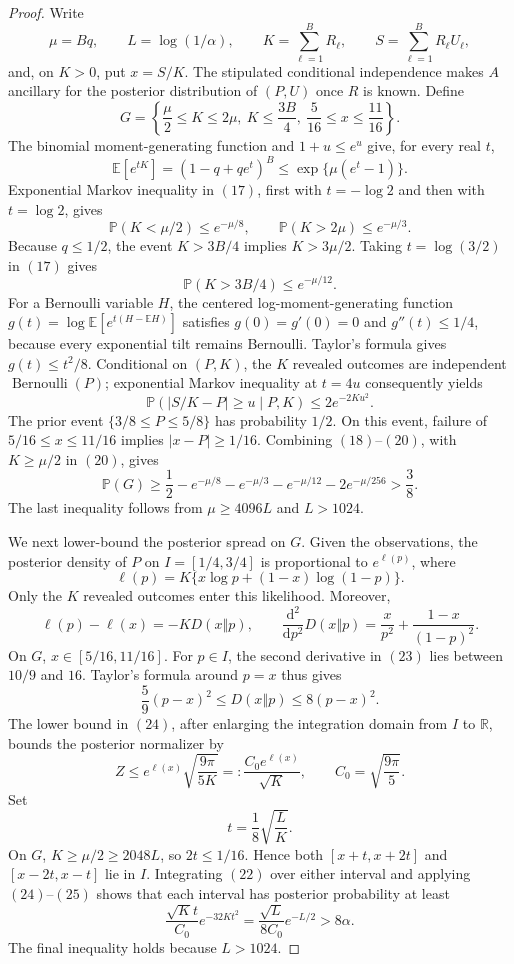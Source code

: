 \documentclass{article}
\begin{document}
\begin{proof}
Write
\[
\mu=Bq,\qquad L=\log(1/\alpha),\qquad K=\sum_{\ell=1}^B R_\ell,\qquad S=\sum_{\ell=1}^B R_\ell U_\ell,
\]
and, on \(K>0\), put \(x=S/K\). The stipulated conditional independence makes \(A\) ancillary for the posterior distribution of \((P,U)\) once \(R\) is known. Define
\[
G=\left\{\frac\mu2\le K\le2\mu,\ K\le\frac{3B}{4},\ \frac5{16}\le x\le\frac{11}{16}\right\}.
\tag{16}
\]
The binomial moment-generating function and \(1+u\le e^u\) give, for every real \(t\),
\[
\mathbb E[e^{tK}]=(1-q+qe^t)^B\le\exp\{\mu(e^t-1)\}.
\tag{17}
\]
Exponential Markov inequality in \((17)\), first with \(t=-\log2\) and then with \(t=\log2\), gives
\[
\mathbb P(K<\mu/2)\le e^{-\mu/8},
\qquad
\mathbb P(K>2\mu)\le e^{-\mu/3}.
\tag{18}
\]
Because \(q\le1/2\), the event \(K>3B/4\) implies \(K>3\mu/2\). Taking \(t=\log(3/2)\) in \((17)\) gives
\[
\mathbb P(K>3B/4)\le e^{-\mu/12}.
\tag{19}
\]
For a Bernoulli variable \(H\), the centered log-moment-generating function \(g(t)=\log\mathbb E[e^{t(H-\mathbb EH)}]\) satisfies \(g(0)=g'(0)=0\) and \(g''(t)\le1/4\), because every exponential tilt remains Bernoulli. Taylor's formula gives \(g(t)\le t^2/8\). Conditional on \((P,K)\), the \(K\) revealed outcomes are independent \(\operatorname{Bernoulli}(P)\); exponential Markov inequality at \(t=4u\) consequently yields
\[
\mathbb P(|S/K-P|\ge u\mid P,K)\le2e^{-2Ku^2}.
\tag{20}
\]
The prior event \(\{3/8\le P\le5/8\}\) has probability \(1/2\). On this event, failure of \(5/16\le x\le11/16\) implies \(|x-P|\ge1/16\). Combining \((18)\)--\((20)\), with \(K\ge\mu/2\) in \((20)\), gives
\[
\mathbb P(G)
\ge\frac12-e^{-\mu/8}-e^{-\mu/3}-e^{-\mu/12}-2e^{-\mu/256}
>\frac38.
\tag{21}
\]
The last inequality follows from \(\mu\ge4096L\) and \(L>1024\).

We next lower-bound the posterior spread on \(G\). Given the observations, the posterior density of \(P\) on \(I=[1/4,3/4]\) is proportional to \(e^{\ell(p)}\), where
\[
\ell(p)=K\{x\log p+(1-x)\log(1-p)\}.
\tag{22}
\]
Only the \(K\) revealed outcomes enter this likelihood. Moreover,
\[
\ell(p)-\ell(x)=-K D(x\mathbin\Vert p),
\qquad
\frac{\mathrm d^2}{\mathrm dp^2}D(x\mathbin\Vert p)=\frac{x}{p^2}+\frac{1-x}{(1-p)^2}.
\tag{23}
\]
On \(G\), \(x\in[5/16,11/16]\). For \(p\in I\), the second derivative in \((23)\) lies between \(10/9\) and \(16\). Taylor's formula around \(p=x\) thus gives
\[
\frac59(p-x)^2\le D(x\mathbin\Vert p)\le8(p-x)^2.
\tag{24}
\]
The lower bound in \((24)\), after enlarging the integration domain from \(I\) to \(\mathbb R\), bounds the posterior normalizer by
\[
Z\le e^{\ell(x)}\sqrt{\frac{9\pi}{5K}}=:\frac{C_0e^{\ell(x)}}{\sqrt K},
\qquad C_0=\sqrt{\frac{9\pi}{5}}.
\tag{25}
\]
Set
\[
t=\frac18\sqrt{\frac{L}{K}}.
\tag{26}
\]
On \(G\), \(K\ge\mu/2\ge2048L\), so \(2t\le1/16\). Hence both \([x+t,x+2t]\) and \([x-2t,x-t]\) lie in \(I\). Integrating \((22)\) over either interval and applying \((24)\)--\((25)\) shows that each interval has posterior probability at least
\[
\frac{\sqrt Kt}{C_0}e^{-32Kt^2}=\frac{\sqrt L}{8C_0}e^{-L/2}>8\alpha.
\tag{27}
\]
The final inequality holds because \(L>1024\).


\end{proof}
\end{document}
